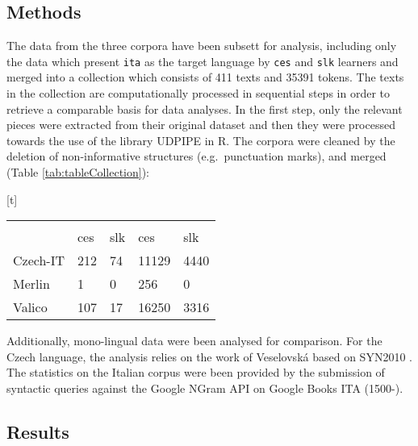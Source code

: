 \documentclass[
  a4paper,
  twoside,
  12pt,
  chapterprefix=false,
  listof=flat]{scrartcl}
\makeatletter
\renewenvironment{table}[1][\fps@table]{
  \edef\@tempa{\noexpand\@float{table}[#1]} 
  \@tempa
  \sffamily
  \footnotesize
}{
  \end@float
}
\theoremstyle{plain} %
\theoremstyle{definition}
\theoremstyle{remark}
\makeatother
\begin{document}
\hypertarget{methods}{%
\subsection{Methods}\label{methods}}

The data from the three corpora have been subsett for analysis, including only the data which present \texttt{ita} as the target language by \texttt{ces} and \texttt{slk} learners and merged into a collection which consists of 411 texts and 35391 tokens.
The texts in the collection are computationally processed in sequential steps in order to retrieve a comparable basis for data analyses. In the first step, only the relevant pieces were extracted from their original dataset and then they were processed towards the use of the library UDPIPE \citep{udpipe2017} in R. The corpora were cleaned by the deletion of non-informative structures (e.g.~punctuation marks), and merged (Table \ref{tab:tableCollection}):

\begin{table}[t]

\caption{\label{tab:tableCollection}\label{tab:tableCollection}Structure of data in the collection}
\centering
\begin{tabu} to 
\toprule
{} &  &  \\
\cmidrule(l{3pt}r{3pt}){2-3} \cmidrule(l{3pt}r{3pt}){4-5}
  & ces & slk & ces & slk\\
\midrule
Czech-IT & 212 & 74 & 11129 & 4440\\
Merlin & 1 & 0 & 256 & 0\\
Valico & 107 & 17 & 16250 & 3316\\
\bottomrule
\end{tabu}
\end{table}

Additionally, mono-lingual data were been analysed for comparison. For the Czech language, the analysis relies on the work of Veselovská \citep{veselovska2014} based on SYN2010 \citep{syn2010}. The statistics on the Italian corpus were been provided by the submission of syntactic queries against the Google NGram API \citep{ngram2011} on Google Books ITA (1500-).

\hypertarget{results}{%
\subsection{Results}\label{results}}
\end{document}
